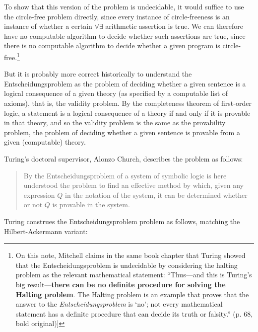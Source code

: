 \documentclass{amsart}
\begin{document}
To show that this version of the problem is undecidable, it would suffice to use the circle-free problem directly, since every instance of circle-freeness is an instance of whether a certain $\forall\exists$ arithmetic assertion is true. We can therefore have no computable algorithm to decide whether such assertions are true, since there is no computable algorithm to decide whether a given program is circle-free.\footnote{On this note, Mitchell claims in the same book chapter that Turing showed that the Entscheidungsproblem is undecidable by considering the halting problem as the relevant mathematical statement: \enquote{Thus---and this is Turing's big result---\textbf{there can be no definite procedure for solving the Halting problem}. The Halting problem is an example that proves that the answer to the \textit{Entscheidungsproblem} is \enquote{no}; not every mathematical statement has a definite procedure that can decide its truth or falsity.} (p. 68, bold original)]}

But it is probably more correct historically to understand the Entscheidungsproblem as the problem of deciding whether a given sentence is a logical consequence of a given theory (as specified by a computable list of axioms), that is, the validity problem. By the completeness theorem of first-order logic, a statement is a logical consequence of a theory if and only if it is provable in that theory, and so the validity problem is the same as the provability problem, the problem of deciding whether a given sentence is provable from a given (computable) theory. 

Turing's doctoral supervisor, Alonzo Church, describes the problem as follows:

\begin{quote}\small

By the Entscheidungsproblem of a system of symbolic logic is here understood the problem to find an effective method by which, given any expression $Q$ in the notation of the system, it can be determined whether or not $Q$ is provable in the system. \cite[footnote 6]{church1936note}
    
\end{quote}

Turing construes the Entscheidungsproblem problem as follows, matching the Hilbert-Ackermann variant:
\end{document}
